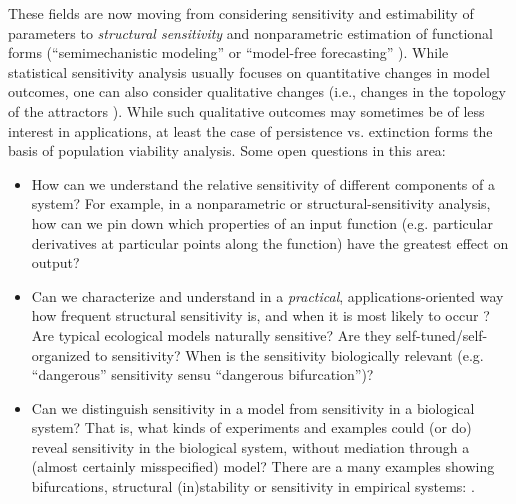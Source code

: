 \documentclass{article}
\begin{document}
These fields are now moving from considering sensitivity and estimability of parameters to \emph{structural sensitivity} \citep{adamson_when_2013} and nonparametric estimation of functional forms  (``semimechanistic modeling'' \citep{wood_partially_2001} or ``model-free forecasting'' \citep{perretti2013model,perretti2013nonparametric}). While statistical sensitivity analysis usually focuses on quantitative changes in model outcomes, one can also consider qualitative changes (i.e., changes in the topology of the attractors \citep{adamson_when_2013}). While such qualitative outcomes may sometimes be of less interest in applications, at least the case of persistence vs. extinction forms the basis of population viability analysis. Some open questions in this area:
\begin{itemize}
\item How can we understand the relative sensitivity of different components of a system? For example, in a nonparametric or structural-sensitivity analysis, how can we pin down which properties of an input function (e.g. particular derivatives at particular points along the function) have the greatest effect on output?
\item Can we characterize and understand in a \emph{practical}, applications-oriented way how frequent structural sensitivity is, and when it is most likely to occur \citep{munch2018nonlinear}? Are typical ecological models naturally sensitive? Are they self-tuned/self-organized to sensitivity? When is the sensitivity biologically relevant (e.g. “dangerous” sensitivity sensu “dangerous bifurcation”)?
\item Can we distinguish sensitivity in a model from sensitivity in a biological system?  That is, what kinds of experiments and examples could (or do) reveal sensitivity in the biological system, without mediation through a (almost certainly misspecified) model?  There are a many examples showing bifurcations, structural (in)stability or sensitivity in empirical systems: \citep{veilleux_analysis_1979,fussmann_crossing_2000,cushing_chaotic_2001,melbourne_highly_2009}.
\end{itemize}

\end{document}
